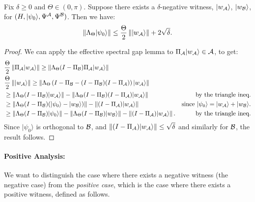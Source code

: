 \documentclass{article}
\def\ket#1{{\lvert}#1\rangle}
\renewcommand{\>}{\rangle}
\newcommand{\<}{\langle}
\renewcommand{\(}{\left(}
\renewcommand{\)}{\right)}
\def\norm#1{\left\| #1 \right\|}
\begin{document}
\begin{lemma}\label{lem:lin-alg-negative-approx}
Fix $\delta\geq 0$ and $\Theta\in (0,\pi)$. Suppose there exists a $\delta$-negative witness, $\ket{w_{\cal A}}$, $\ket{w_{\cal B}}$, for $(H,\ket{\psi_0},\Psi^{\cal A},\Psi^{\cal B})$. Then we have:
\begin{equation*}
\norm{\Lambda_\Theta\ket{\psi_0}} \leq \frac{\Theta}{2}\norm{\ket{w_{\cal A}}}+2\sqrt{\delta}.
\end{equation*}
\end{lemma}
\begin{proof}
We can apply the effective spectral gap lemma to $\Pi_{\cal A}\ket{w_{\cal A}}\in {\cal A}$, to get:
\begin{align*}
&\frac{\Theta}{2}\norm{\Pi_{\cal A}\ket{w_{\cal A}}} \geq \norm{\Lambda_\Theta(I-\Pi_{\cal B})\Pi_{\cal A}\ket{w_{\cal A}}} \\
&\frac{\Theta}{2}\norm{\ket{w_{\cal A}}} \geq \norm{\Lambda_\Theta\left( I-\Pi_{\cal B} -(I-\Pi_{\cal B})(I-\Pi_{\cal A}) \right)\ket{w_{\cal A}}}\\
&\geq \norm{\Lambda_\Theta( I-\Pi_{\cal B})\ket{w_{\cal A}}} - \norm{\Lambda_\Theta(I-\Pi_{\cal B})(I-\Pi_{\cal A}) \ket{w_{\cal A}}} & \mbox{by the triangle ineq.}\\
&\geq \norm{\Lambda_\Theta( I-\Pi_{\cal B})(\ket{\psi_0}-\ket{w_{\cal B}})} - \norm{(I-\Pi_{\cal A}) \ket{w_{\cal A}}} & \mbox{since }\ket{\psi_0}=\ket{w_{\cal A}}+\ket{w_{\cal B}}.\\
&\geq \norm{\Lambda_\Theta(I-\Pi_{\cal B})\ket{\psi_0}} - \norm{\Lambda_\Theta(I-\Pi_{\cal B})\ket{w_{\cal B}}} - \norm{(I-\Pi_{\cal A}) \ket{w_{\cal A}}}. & \mbox{by the triangle ineq.}
\end{align*}
Since $\ket{\psi_0}$ is orthogonal to ${\cal B}$, and $\norm{(I-\Pi_{\cal A})\ket{w_{\cal A}}}\leq \sqrt{\delta}$ and similarly for ${\cal B}$, the result follows. \end{proof}




\paragraph{Positive Analysis:} 
We want to distinguish the case where there exists a negative witness (the negative case) from the \emph{positive case}, which is the case where there exists a positive witness, defined as follows.
\end{document}
